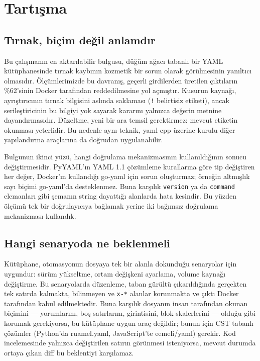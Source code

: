 \documentclass[conference]{IEEEtran}
\begin{document}
\section{Tartışma}
\label{sec:tartisma}

\subsection{Tırnak, biçim değil anlamdır}
Bu çalışmanın en aktarılabilir bulgusu, düğüm ağacı tabanlı bir YAML
kütüphanesinde tırnak kaybının kozmetik bir sorun olarak görülmesinin
yanıltıcı olmasıdır. Ölçümlerimizde bu davranış, geçerli girdilerden
üretilen çıktıların \%62'sinin Docker tarafından reddedilmesine yol
açmıştır. Kusurun kaynağı, ayrıştırıcının tırnak bilgisini aslında
saklaması (\texttt{!} belirtisiz etiketi), ancak serileştiricinin bu
bilgiyi yok sayarak kararını yalnızca değerin metnine dayandırmasıdır.
Düzeltme, yeni bir ara temsil gerektirmez: mevcut etiketin okunması
yeterlidir. Bu nedenle aynı teknik, yaml-cpp üzerine kurulu diğer
yapılandırma araçlarına da doğrudan uygulanabilir.

Bulgunun ikinci yüzü, hangi doğrulama mekanizmasının kullanıldığının sonucu değiştirmesidir.
PyYAML'ın YAML 1.1 çözümleme kurallarına göre tip değiştiren her değer,
Docker'ın kullandığı go-yaml için sorun oluşturmaz; örneğin altmışlık
sayı biçimi go-yaml'da desteklenmez. Buna karşılık \texttt{version} ya da
\texttt{command} elemanları gibi şemanın string dayattığı alanlarda hata
kesindir. Bu yüzden ölçümü tek bir doğrulayıcıya bağlamak yerine iki
bağımsız doğrulama mekanizması kullandık.

\subsection{Hangi senaryoda ne beklenmeli}
Kütüphane, otomasyonun dosyaya tek bir alanla dokunduğu senaryolar için
uygundur: sürüm yükseltme, ortam değişkeni ayarlama, volume kaynağı
değiştirme. Bu senaryolarda düzenleme, taban gürültü çıkarıldığında
gerçekten tek satırda kalmakta, bilinmeyen ve \texttt{x-*} alanlar
korunmakta ve çıktı Docker tarafından kabul edilmektedir. Buna karşılık
dosyanın insan tarafından okunan biçimini --- yorumlarını, boş satırlarını,
girintisini, blok skalerlerini --- olduğu gibi korumak gerekiyorsa, bu
kütüphane uygun araç
değildir; bunun için CST tabanlı çözümler (Python'da ruamel.yaml,
JavaScript'te eemeli/yaml) gerekir. Kod incelemesinde yalnızca
değiştirilen satırın görünmesi isteniyorsa, mevcut durumda ortaya çıkan
diff bu beklentiyi karşılamaz.
\end{document}
